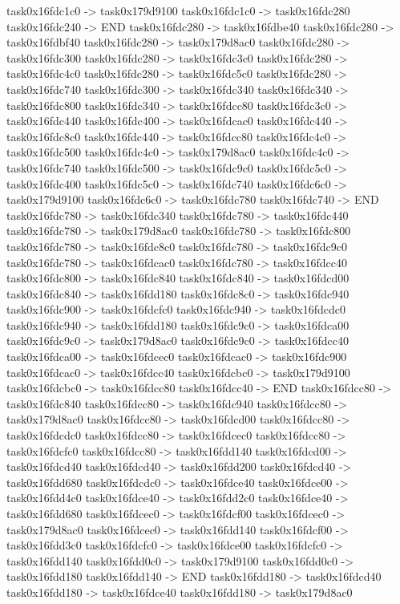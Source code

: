 {	task0x16fdc1c0 -> task0x179d9100
	task0x16fdc1c0 -> task0x16fdc280
	task0x16fdc240 -> END
	task0x16fdc280 -> task0x16fdbe40
	task0x16fdc280 -> task0x16fdbf40
	task0x16fdc280 -> task0x179d8ac0
	task0x16fdc280 -> task0x16fdc300
	task0x16fdc280 -> task0x16fdc3c0
	task0x16fdc280 -> task0x16fdc4c0
	task0x16fdc280 -> task0x16fdc5c0
	task0x16fdc280 -> task0x16fdc740
	task0x16fdc300 -> task0x16fdc340
	task0x16fdc340 -> task0x16fdc800
	task0x16fdc340 -> task0x16fdcc80
	task0x16fdc3c0 -> task0x16fdc440
	task0x16fdc400 -> task0x16fdcac0
	task0x16fdc440 -> task0x16fdc8c0
	task0x16fdc440 -> task0x16fdcc80
	task0x16fdc4c0 -> task0x16fdc500
	task0x16fdc4c0 -> task0x179d8ac0
	task0x16fdc4c0 -> task0x16fdc740
	task0x16fdc500 -> task0x16fdc9c0
	task0x16fdc5c0 -> task0x16fdc400
	task0x16fdc5c0 -> task0x16fdc740
	task0x16fdc6c0 -> task0x179d9100
	task0x16fdc6c0 -> task0x16fdc780
	task0x16fdc740 -> END
	task0x16fdc780 -> task0x16fdc340
	task0x16fdc780 -> task0x16fdc440
	task0x16fdc780 -> task0x179d8ac0
	task0x16fdc780 -> task0x16fdc800
	task0x16fdc780 -> task0x16fdc8c0
	task0x16fdc780 -> task0x16fdc9c0
	task0x16fdc780 -> task0x16fdcac0
	task0x16fdc780 -> task0x16fdcc40
	task0x16fdc800 -> task0x16fdc840
	task0x16fdc840 -> task0x16fdcd00
	task0x16fdc840 -> task0x16fdd180
	task0x16fdc8c0 -> task0x16fdc940
	task0x16fdc900 -> task0x16fdcfc0
	task0x16fdc940 -> task0x16fdcdc0
	task0x16fdc940 -> task0x16fdd180
	task0x16fdc9c0 -> task0x16fdca00
	task0x16fdc9c0 -> task0x179d8ac0
	task0x16fdc9c0 -> task0x16fdcc40
	task0x16fdca00 -> task0x16fdcec0
	task0x16fdcac0 -> task0x16fdc900
	task0x16fdcac0 -> task0x16fdcc40
	task0x16fdcbc0 -> task0x179d9100
	task0x16fdcbc0 -> task0x16fdcc80
	task0x16fdcc40 -> END
	task0x16fdcc80 -> task0x16fdc840
	task0x16fdcc80 -> task0x16fdc940
	task0x16fdcc80 -> task0x179d8ac0
	task0x16fdcc80 -> task0x16fdcd00
	task0x16fdcc80 -> task0x16fdcdc0
	task0x16fdcc80 -> task0x16fdcec0
	task0x16fdcc80 -> task0x16fdcfc0
	task0x16fdcc80 -> task0x16fdd140
	task0x16fdcd00 -> task0x16fdcd40
	task0x16fdcd40 -> task0x16fdd200
	task0x16fdcd40 -> task0x16fdd680
	task0x16fdcdc0 -> task0x16fdce40
	task0x16fdce00 -> task0x16fdd4c0
	task0x16fdce40 -> task0x16fdd2c0
	task0x16fdce40 -> task0x16fdd680
	task0x16fdcec0 -> task0x16fdcf00
	task0x16fdcec0 -> task0x179d8ac0
	task0x16fdcec0 -> task0x16fdd140
	task0x16fdcf00 -> task0x16fdd3c0
	task0x16fdcfc0 -> task0x16fdce00
	task0x16fdcfc0 -> task0x16fdd140
	task0x16fdd0c0 -> task0x179d9100
	task0x16fdd0c0 -> task0x16fdd180
	task0x16fdd140 -> END
	task0x16fdd180 -> task0x16fdcd40
	task0x16fdd180 -> task0x16fdce40
	task0x16fdd180 -> task0x179d8ac0
}
